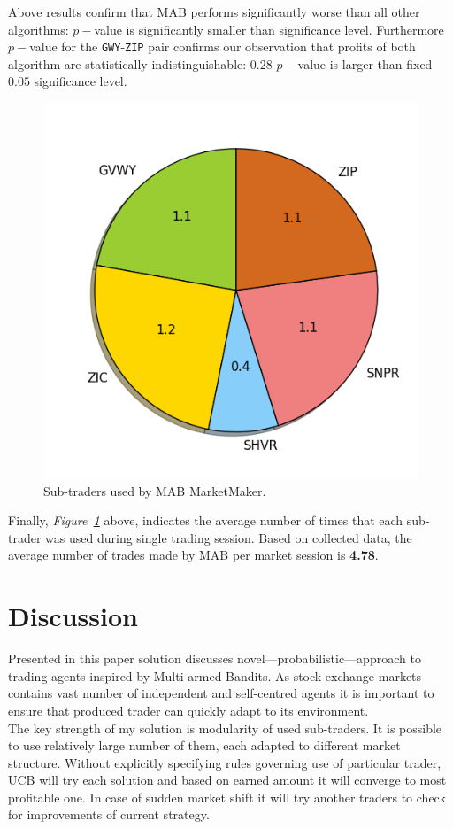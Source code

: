 \documentclass{llncs}
\begin{document}
Above results confirm that MAB performs significantly worse than all other algorithms: $p-$value is significantly smaller than significance level. Furthermore $p-$value for the \texttt{GWY}-\texttt{ZIP} pair confirms our observation that profits of both algorithm are statistically indistinguishable: $0.28$ $p-$value is larger than fixed $0.05$ significance level.\\

\begin{figure}[ht]
  \centering
  \includegraphics[width=.5\textwidth]{fig/pie.png}
  \caption{Sub-traders used by MAB MarketMaker.\label{fig:MABalgo}}
\end{figure}

Finally, \emph{Figure~\ref{fig:MABalgo}} above, indicates the average number of times that each sub-trader was used during single trading session. Based on collected data, the average number of trades made by MAB per market session is \textbf{4.78}.\\



\section{Discussion}
Presented in this paper solution discusses novel---probabilistic---approach to trading agents inspired by Multi-armed Bandits. As stock exchange markets contains vast number of independent and self-centred agents it is important to ensure that produced trader can quickly adapt to its environment.\\
The key strength of my solution is modularity of used sub-traders. It is possible to use relatively large number of them, each adapted to different market structure. Without explicitly specifying rules governing use of particular trader, UCB will try each solution and based on earned amount it will converge to most profitable one. In case of sudden market shift it will try another traders to check for improvements of current strategy.\\
\end{document}
